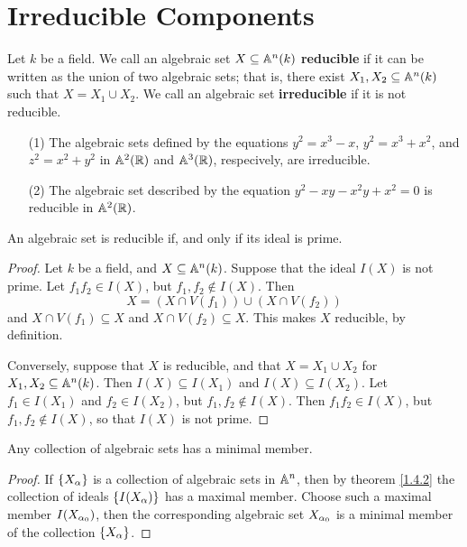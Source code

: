 \section{Irreducible Components}

\begin{definition}
    Let $k$ be a field. We call an algebraic set $X \subseteq \mathbb{A}^n(k)$
    \textbf{reducible} if it can be written as the union of two algebraic sets;
    that is, there exist $X_1,X_2 \subseteq \mathbb{A}^n(k)$ such that $X=X_1 \cup X_2$.
    We call an algebraic set \textbf{irreducible} if it is not reducible.
\end{definition}

\begin{example}\label{example_1.7}
    \begin{enumerate}
        \item[(1)] The algebraic sets defined by the equations $y^2=x^3-x$,
            $y^2=x^3+x^2$, and $z^2=x^2+y^2$ in $\mathbb{A}^2(\mathbb{R})$ and $\mathbb{A}^3(\mathbb{R})$,
            respecively, are irreducible.

        \item[(2)] The algebraic set described by the equation
            $y^2-xy-x^2y+x^2=0$ is reducible in $\mathbb{A}^2(\mathbb{R})$.
    \end{enumerate}
\end{example}

\begin{lemma}\label{1.5.1}
    An algebraic set is reducible if, and only if its ideal is prime.
\end{lemma}
\begin{proof}
    Let $k$ be a field, and  $X \subseteq \mathbb{A}^n(k)$. Suppose that the ideal
    $I(X)$ is not prime. Let $f_1f_2 \in I(X)$, but $f_1,f_2 \not\in I(X)$.
    Then
    \begin{equation*}
        X=(X \cap V(f_1)) \cup (X \cap V(f_2))
    \end{equation*}
    and $X \cap V(f_1) \subseteq X$ and $X \cap V(f_2) \subseteq X$. This makes
    $X$ reducible, by definition.

    Conversely, suppose that $X$ is reducible, and that $X=X_1 \cup X_2$ for
    $X_1, X_2 \subseteq \mathbb{A}^n(k)$. Then $I(X) \subseteq I(X_1)$ and $I(X)
    \subseteq I(X_2)$. Let $f_1 \in I(X_1)$ and $f_2 \in I(X_2)$, but $f_1,f_2
    \not\in I(X)$. Then $f_1f_2 \in I(X)$, but $f_1,f_2 \not\in I(X)$, so that
    $I(X)$ is not prime.
\end{proof}

\begin{lemma}\label{1.5.2}
    Any collection of algebraic sets has a minimal member.
\end{lemma}
\begin{proof}
    If $\{X_\alpha\}$ is a collection of algebraic sets in $\mathbb{A}^n$, then by theorem
    \ref{1.4.2} the collection of ideals $\{I(X_\alpha)\}$ has a maximal member.
    Choose such a maximal member $I(X_{\alpha_0})$, then the corresponding algebraic
    set $X_{\alpha_0}$ is a minimal member of the collection $\{X_\alpha\}$.
\end{proof}

